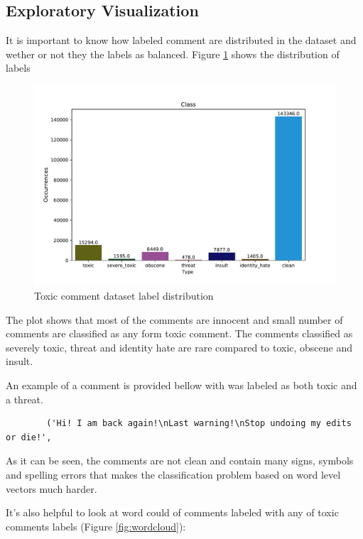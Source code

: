 \documentclass{article}
\begin{document}
    \subsection{Exploratory Visualization}

    It is important to know how labeled comment are distributed in the dataset and wether or not they the labels as balanced. Figure \ref{fig:labels} shows the distribution of labels 

    \begin{figure}[!h]
        \centering
        \includegraphics[scale=0.7]{figures/labels.pdf}
        \caption{Toxic comment dataset label distribution}
        \label{fig:labels}
    \end{figure}

    The plot shows that most of the comments are innocent and small number of comments are classified as any form toxic comment. The comments classified as severely toxic, threat and identity hate are rare compared to toxic, obscene and insult.
    
    An example of a comment is provided bellow with was labeled as both toxic and a threat.

    \begin{verbatim}
        ('Hi! I am back again!\nLast warning!\nStop undoing my edits or die!',
    \end{verbatim}

    As it can be seen, the comments are not clean and contain many signs, symbols and spelling errors that makes the classification problem based on word level vectors much harder.

    It's also helpful to look at word could of comments labeled with any of toxic comments labels (Figure \ref{fig:wordcloud}):
\end{document}
